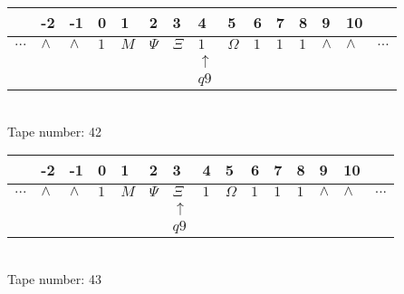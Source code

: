\documentclass{article}
\begin{document}
\begin{table}[H]
\centering
\begin{tabular}{lllllllllllllll}
 & -2 & -1 & 0 & 1 & 2 & 3 & 4 & 5 & 6 & 7 & 8 & 9 & 10 & \\
\hline
$...$ & \multicolumn{1}{|l|}{$\wedge$} & \multicolumn{1}{|l|}{$\wedge$} & \multicolumn{1}{|l|}{$1$} & \multicolumn{1}{|l|}{$M$} & \multicolumn{1}{|l|}{$\Psi$} & \multicolumn{1}{|l|}{$\Xi$} & \multicolumn{1}{|l|}{$1$} & \multicolumn{1}{|l|}{$\Omega$} & \multicolumn{1}{|l|}{$1$} & \multicolumn{1}{|l|}{$1$} & \multicolumn{1}{|l|}{$1$} & \multicolumn{1}{|l|}{$\wedge$} & \multicolumn{1}{|l|}{$\wedge$} & $...$\\
\hline
&  &  &  &  &  &  & $\uparrow$ &  &  &  &  &  &  &  \\
&  &  &  &  &  &  & $ q9 $ &  &  &  &  &  &  &  \\
\end{tabular}
\\
Tape number: 42
\noindent\makebox[\linewidth]{\hdashrule{\textwidth}{1pt}{1pt}}\end{table}

\begin{table}[H]
\centering
\begin{tabular}{lllllllllllllll}
 & -2 & -1 & 0 & 1 & 2 & 3 & 4 & 5 & 6 & 7 & 8 & 9 & 10 & \\
\hline
$...$ & \multicolumn{1}{|l|}{$\wedge$} & \multicolumn{1}{|l|}{$\wedge$} & \multicolumn{1}{|l|}{$1$} & \multicolumn{1}{|l|}{$M$} & \multicolumn{1}{|l|}{$\Psi$} & \multicolumn{1}{|l|}{$\Xi$} & \multicolumn{1}{|l|}{$1$} & \multicolumn{1}{|l|}{$\Omega$} & \multicolumn{1}{|l|}{$1$} & \multicolumn{1}{|l|}{$1$} & \multicolumn{1}{|l|}{$1$} & \multicolumn{1}{|l|}{$\wedge$} & \multicolumn{1}{|l|}{$\wedge$} & $...$\\
\hline
&  &  &  &  &  & $\uparrow$ &  &  &  &  &  &  &  &  \\
&  &  &  &  &  & $ q9 $ &  &  &  &  &  &  &  &  \\
\end{tabular}
\\
Tape number: 43
\noindent\makebox[\linewidth]{\hdashrule{\textwidth}{1pt}{1pt}}\end{table}
\end{document}
